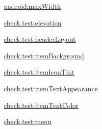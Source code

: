 {\ttfamily \hyperlink{classcheck_1_1test_1_1_r_1_1styleable_a14840a3ae29e9331de83b023e02fa994}{android\+:max\+Width}}

{\ttfamily \hyperlink{classcheck_1_1test_1_1_r_1_1styleable_a88ddf97958b48ba8933c1d24db5015fa}{check.\+test\+:elevation}}

{\ttfamily \hyperlink{classcheck_1_1test_1_1_r_1_1styleable_ab9421b2c3084fab03258249932b7e0fd}{check.\+test\+:header\+Layout}}

{\ttfamily \hyperlink{classcheck_1_1test_1_1_r_1_1styleable_a6f64b2a76b94c56288e3b8818af36228}{check.\+test\+:item\+Background}}

{\ttfamily \hyperlink{classcheck_1_1test_1_1_r_1_1styleable_ae351f9847230f9848b52f060c63c4bdd}{check.\+test\+:item\+Icon\+Tint}}

{\ttfamily \hyperlink{classcheck_1_1test_1_1_r_1_1styleable_ad7564a8ef74749a8d3928c139af4eaa6}{check.\+test\+:item\+Text\+Appearance}}

{\ttfamily \hyperlink{classcheck_1_1test_1_1_r_1_1styleable_aee02dda2f676d8cbb891a1e27e386d49}{check.\+test\+:item\+Text\+Color}}

{\ttfamily \hyperlink{classcheck_1_1test_1_1_r_1_1styleable_a96d0c1fc480a50b365523e0530106f73}{check.\+test\+:menu}}


